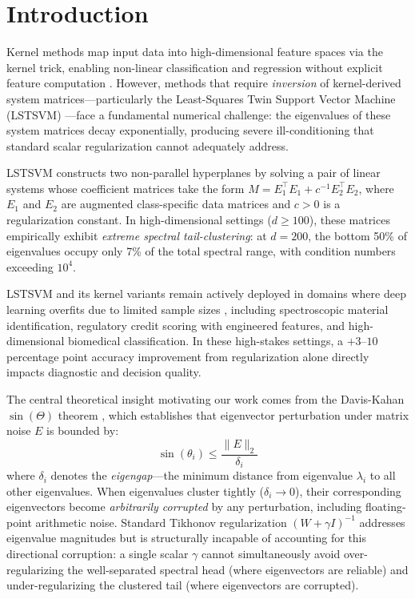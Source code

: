 \documentclass[preprint,review,12pt]{elsarticle}
\begin{document}
\linenumbers



\section{Introduction}
\label{sec:introduction}

Kernel methods map input data into high-dimensional feature spaces via the kernel trick, enabling non-linear classification and regression without explicit feature computation \cite{cortes1995support, hofmann2008kernel}. However, methods that require \emph{inversion} of kernel-derived system matrices---particularly the Least-Squares Twin Support Vector Machine (LSTSVM) \cite{kumar2009lstsvm}---face a fundamental numerical challenge: the eigenvalues of these system matrices decay exponentially, producing severe ill-conditioning that standard scalar regularization cannot adequately address.

LSTSVM constructs two non-parallel hyperplanes by solving a pair of linear systems whose coefficient matrices take the form $M = E_1^\top E_1 + c^{-1} E_2^\top E_2$, where $E_1$ and $E_2$ are augmented class-specific data matrices and $c > 0$ is a regularization constant. In high-dimensional settings ($d \geq 100$), these matrices empirically exhibit \emph{extreme spectral tail-clustering}: at $d{=}200$, the bottom 50\% of eigenvalues occupy only 7\% of the total spectral range, with condition numbers exceeding $10^4$.

LSTSVM and its kernel variants remain actively deployed in domains where deep learning overfits due to limited sample sizes \cite{tanveer2022comprehensive}, including spectroscopic material identification, regulatory credit scoring with engineered features, and high-dimensional biomedical classification. In these high-stakes settings, a $+3$--$10$ percentage point accuracy improvement from regularization alone directly impacts diagnostic and decision quality.

The central theoretical insight motivating our work comes from the Davis-Kahan $\sin(\Theta)$ theorem \cite{davis1970rotation}, which establishes that eigenvector perturbation under matrix noise $E$ is bounded by:
\begin{equation}
\sin(\theta_i) \leq \frac{\|E\|_2}{\delta_i}
\label{eq:davis_kahan_intro}
\end{equation}
where $\delta_i$ denotes the \emph{eigengap}---the minimum distance from eigenvalue $\lambda_i$ to all other eigenvalues. When eigenvalues cluster tightly ($\delta_i \to 0$), their corresponding eigenvectors become \emph{arbitrarily corrupted} by any perturbation, including floating-point arithmetic noise. Standard Tikhonov regularization $(W + \gamma I)^{-1}$ addresses eigenvalue magnitudes but is structurally incapable of accounting for this directional corruption: a single scalar $\gamma$ cannot simultaneously avoid over-regularizing the well-separated spectral head (where eigenvectors are reliable) and under-regularizing the clustered tail (where eigenvectors are corrupted).
\end{document}
